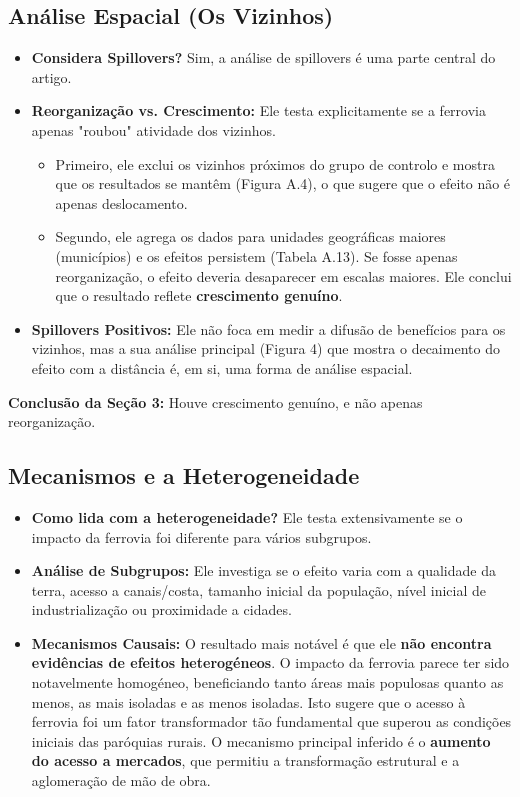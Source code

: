 \documentclass[12pt, a4paper]{article}
\begin{document}
\subsection{Análise Espacial (Os Vizinhos)}
\begin{itemize}
    \item \textbf{Considera Spillovers?} Sim, a análise de spillovers é uma parte central do artigo.
    \item \textbf{Reorganização vs. Crescimento:} Ele testa explicitamente se a ferrovia apenas "roubou" atividade dos vizinhos.
    \begin{itemize}
        \item Primeiro, ele exclui os vizinhos próximos do grupo de controlo e mostra que os resultados se mantêm (Figura A.4), o que sugere que o efeito não é apenas deslocamento.
        \item Segundo, ele agrega os dados para unidades geográficas maiores (municípios) e os efeitos persistem (Tabela A.13). Se fosse apenas reorganização, o efeito deveria desaparecer em escalas maiores. Ele conclui que o resultado reflete \textbf{crescimento genuíno}.
    \end{itemize}
    \item \textbf{Spillovers Positivos:} Ele não foca em medir a difusão de benefícios para os vizinhos, mas a sua análise principal (Figura 4) que mostra o decaimento do efeito com a distância é, em si, uma forma de análise espacial.
\end{itemize}

\noindent\textbf{Conclusão da Seção 3:} Houve crescimento genuíno, e não apenas reorganização.

\subsection{Mecanismos e a Heterogeneidade}
\begin{itemize}
    \item \textbf{Como lida com a heterogeneidade?} Ele testa extensivamente se o impacto da ferrovia foi diferente para vários subgrupos.
    \item \textbf{Análise de Subgrupos:} Ele investiga se o efeito varia com a qualidade da terra, acesso a canais/costa, tamanho inicial da população, nível inicial de industrialização ou proximidade a cidades.
    \item \textbf{Mecanismos Causais:} O resultado mais notável é que ele \textbf{não encontra evidências de efeitos heterogéneos}. O impacto da ferrovia parece ter sido notavelmente homogéneo, beneficiando tanto áreas mais populosas quanto as menos, as mais isoladas e as menos isoladas. Isto sugere que o acesso à ferrovia foi um fator transformador tão fundamental que superou as condições iniciais das paróquias rurais. O mecanismo principal inferido é o \textbf{aumento do acesso a mercados}, que permitiu a transformação estrutural e a aglomeração de mão de obra.
\end{itemize}
\end{document}
